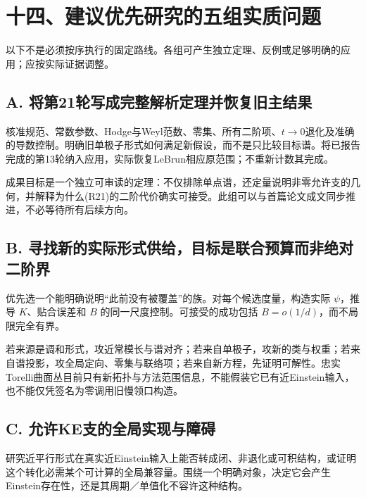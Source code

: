 \documentclass[
  11pt,
  a4paper,
  fontset=none]{ctexart}
\begin{document}
\section{十四、建议优先研究的五组实质问题}\label{ux5341ux56dbux5efaux8baeux4f18ux5148ux7814ux7a76ux7684ux4e94ux7ec4ux5b9eux8d28ux95eeux9898}

以下不是必须按序执行的固定路线。各组可产生独立定理、反例或足够明确的应用；应按实际证据调整。

\subsection{A.
将第21轮写成完整解析定理并恢复旧主结果}\label{a.-ux5c06ux7b2c21ux8f6eux5199ux6210ux5b8cux6574ux89e3ux6790ux5b9aux7406ux5e76ux6062ux590dux65e7ux4e3bux7ed3ux679c}

核准规范、常数参数、Hodge与Weyl范数、零集、所有二阶项、\(t\to0\)退化及准确的导数控制。明确旧单极子形式如何满足新假设，而不是只比较目标谱。将已报告完成的第13轮纳入应用，实际恢复LeBrun相应原范围；不重新计数其完成。

成果目标是一个独立可审读的定理：不仅排除单点谱，还定量说明非零允许支的几何，并解释为什么(R21)的二阶代价确实可接受。此组可以与首篇论文成文同步推进，不必等待所有后续方向。

\subsection{B.
寻找新的实际形式供给，目标是联合预算而非绝对二阶界}\label{b.-ux5bfbux627eux65b0ux7684ux5b9eux9645ux5f62ux5f0fux4f9bux7ed9ux76eeux6807ux662fux8054ux5408ux9884ux7b97ux800cux975eux7eddux5bf9ux4e8cux9636ux754c}

优先选一个能明确说明``此前没有被覆盖''的族。对每个候选度量，构造实际
\(\psi\)，推导 \(K\)、贴合误差和 \(B\) 的同一尺度控制。可接受的成功包括
\(B=o(1/d)\)，而不局限完全有界。

若来源是调和形式，攻近常模长与谱对齐；若来自单极子，攻新的类与权重；若来自谱投影，攻全局定向、零集与联络项；若来自新方程，先证明可解性。忠实Torelli曲面丛目前只有新拓扑与方法范围信息，不能假装它已有近Einstein输入，也不能仅凭签名为零调用旧慢领口构造。

\subsection{C.
允许KE支的全局实现与障碍}\label{c.-ux5141ux8bb8keux652fux7684ux5168ux5c40ux5b9eux73b0ux4e0eux969cux788d}

研究近平行形式在真实近Einstein输入上能否转成闭、非退化或可积结构，或证明这个转化必需某个可计算的全局兼容量。围绕一个明确对象，决定它会产生Einstein存在性，还是其周期／单值化不容许这种结构。
\end{document}
